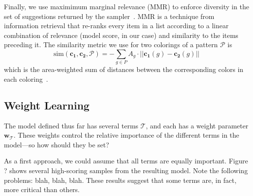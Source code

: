 Finally, we use maximimum marginal relevance (MMR) to enforce diversity in the set of suggestions returned by the sampler~\cite{MMR}. MMR is a technique from information retrieval that re-ranks every item in a list according to a linear combination of relevance (model score, in our case) and similarity to the items preceding it. The similarity metric we use for two colorings of a pattern $\mathcal{P}$ is
\begin{equation*}
\text{sim}(\mathbf{c_1}, \mathbf{c_2}, \mathcal{P}) = - \sum_{g \in P} {A_g \cdot ||\mathbf{c_1}(g) - \mathbf{c_2}(g)||}
\end{equation*}
which is the area-weighted sum of \lab distances between the corresponding colors in each coloring~.

\subsection{Weight Learning}
\label{sec:weights}

\newcommand{\pattern}{\mathcal{P}}
\newcommand{\model}{\mathcal{M}}
\newcommand{\template}{\mathcal{T}}
\newcommand{\weights}{\mathbf{w}}
\newcommand{\dataset}{\mathcal{D}}
\newcommand{\factor}{\mathcal{F}}
\newcommand{\variable}[1]{\mathbf{#1}}
\newcommand{\stats}[3]{\phi_{#1}(#2,#3)}
\newcommand{\expectation}{\mathds{E}}


The model defined thus far has several terms $\template$, and each has a weight parameter $\weights_\template$. These weights control the relative importance of the different terms in the model---so how should they be set?

As a first approach, we could assume that all terms are equally important. Figure ? shows several high-scoring samples from the resulting model. Note the following problems: blah, blah, blah. These results suggest that some terms are, in fact, more critical than others.

